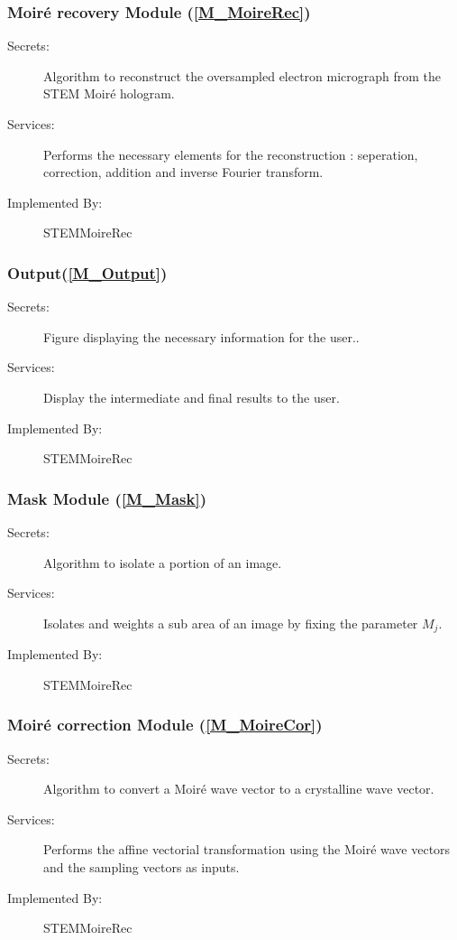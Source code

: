 \documentclass[12pt, titlepage]{article}
\newcommand{\progname}{STEMMoireRec}
\begin{document}
\subsubsection{Moir{\'e} recovery Module (\texorpdfstring{\cref{M_MoireRec}}))}
\label{MG_MoireRec}
\begin{description}
\item[Secrets:] Algorithm to reconstruct the oversampled electron micrograph from the STEM Moir{\'e} hologram.
\item[Services:] Performs the necessary elements for the reconstruction : seperation, correction, addition and inverse Fourier transform.
\item[Implemented By:] \progname{}
\end{description}

\subsubsection{Output(\texorpdfstring{\cref{M_Output}}))}
\label{MG_Output}
\begin{description}
\item[Secrets:] Figure displaying the necessary information for the user..
\item[Services:] Display the intermediate and final results to the user.
\item[Implemented By:] \progname{}
\end{description}


\subsubsection{Mask Module (\texorpdfstring{\cref{M_Mask}}))}
\label{MG_Mask}
\begin{description}
\item[Secrets:] Algorithm to isolate a portion of an image.
\item[Services:] Isolates and weights a sub area of an image by fixing the 
parameter $M_j$.
\item[Implemented By:] \progname{}
\end{description}

\subsubsection{Moir{\'e} correction Module (\texorpdfstring{\cref{M_MoireCor}}))}
\label{MG_MoireCor}
\begin{description}
\item[Secrets:] Algorithm to convert a Moir{\'e} wave vector to a crystalline 
wave vector.
\item[Services:] Performs the affine vectorial transformation using the 
Moir{\'e} wave vectors and the sampling vectors as inputs.
\item[Implemented By:] \progname{}
\end{description}
\end{document}
